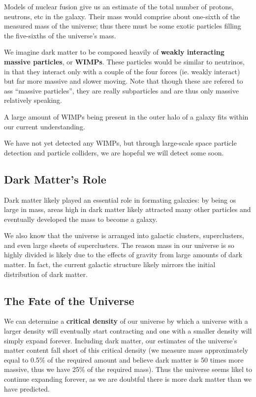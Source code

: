 Models of nuclear fusion give us an estimate of the total number of protons, neutrons, etc in the galaxy. Their mass would comprise about one-sixth of the measured mass of the universe; thus there must be some exotic particles filling the five-sixths of the universe's mass.

We imagine dark matter to be composed heavily of {\bf weakly interacting massive particles}, or {\bf WIMPs}. These particles would be similar to neutrinos, in that they interact only with a couple of the four forces (ie. weakly interact) but far more massive and slower moving. Note that though these are refered to ass ``massive particles'', they are really subparticles and are thus only massive relatively speaking.

A large amount of WIMPs being present in the outer halo of a galaxy fits within our current understanding.

We have not yet detected any WIMPs, but through large-scale space particle detection and particle colliders, we are hopeful we will detect some soon.

\subsection{Dark Matter's Role}
Dark matter likely played an essential role in formating galaxies: by being os large in mass, areas high in dark matter likely attracted many other particles and eventually developed the mass to become a galaxy.

We also know that the universe is arranged into galactic clusters, superclusters, and even large sheets of superclusters. The reason mass in our universe is so highly divided is likely due to the effects of gravity from large amounts of dark matter. In fact, the current galactic structure likely mirrors the initial distribution of dark matter.

\subsection{The Fate of the Universe}
We can determine a {\bf critical density} of our universe by which a universe with a larger density will eventually start contracting and one with a smaller density will simply expand forever. Including dark matter, our estimates of the universe's matter content fall short of this critical density (we measure mass approximately equal to 0.5\% of the required amount and believe dark matter is 50 times more massive, thus we have 25\% of the required mass). Thus the universe seems likel to continue expanding forever, as we are doubtful there is more dark matter than we have predicted.

